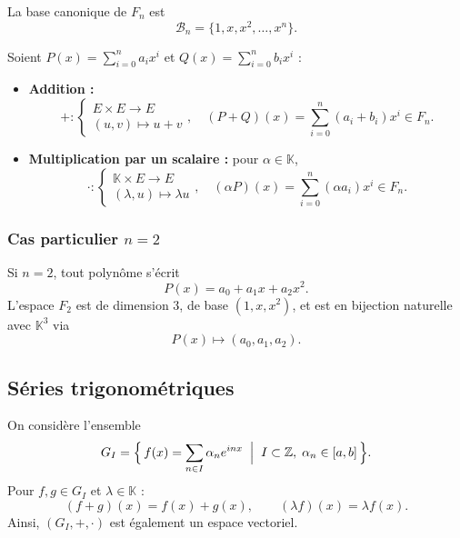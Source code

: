 \medskip
La base canonique de $F_n$ est
\[
  \mathcal{B}_n = \{1, x, x^2, \dots, x^n\}.
\]

Soient $P(x)=\sum_{i=0}^n a_i x^i$ et $Q(x)=\sum_{i=0}^n b_i x^i$ :
\begin{itemize}
  \item \textbf{Addition :}
    \[
        +:\begin{cases}E\times E\rightarrow E\\(u,v)\mapsto u+v\end{cases},\quad
        (P+Q)(x) = \sum_{i=0}^n (a_i+b_i)x^i \in F_n.
    \]

  \item \textbf{Multiplication par un scalaire :} pour $\alpha \in \mathbb{K}$,
    \[
        \cdot:\begin{cases}\mathbb{K}\times E\rightarrow E\\(\lambda,u)\mapsto \lambda u\end{cases},\quad
        (\alpha P)(x) = \sum_{i=0}^n (\alpha a_i)x^i \in F_n.
    \]
\end{itemize}

\subsubsection{Cas particulier $n=2$}
Si $n=2$, tout polynôme s’écrit
\[
  P(x) = a_0 + a_1x + a_2x^2.
\]
L’espace $F_2$ est de dimension $3$, de base $(1,x,x^2)$, et est en
bijection naturelle avec
$\mathbb{K}^3$ via
\[
  P(x) \longmapsto (a_0,a_1,a_2).
\]

\subsection{Séries trigonométriques}
On considère l’ensemble
\[
  G_I = \Bigl\{\, f(x) = \sum_{n\in I} \alpha_n e^{inx}
  \;\Bigm|\; I \subset \mathbb{Z},\; \alpha_n \in [a,b] \,\Bigr\}.
\]
Pour $f,g \in G_I$ et $\lambda \in \mathbb{K}$ :
\[
  (f+g)(x) = f(x)+g(x),
  \qquad
  (\lambda f)(x) = \lambda f(x).
\]
Ainsi, $(G_I,+,\cdot)$ est également un espace vectoriel.
